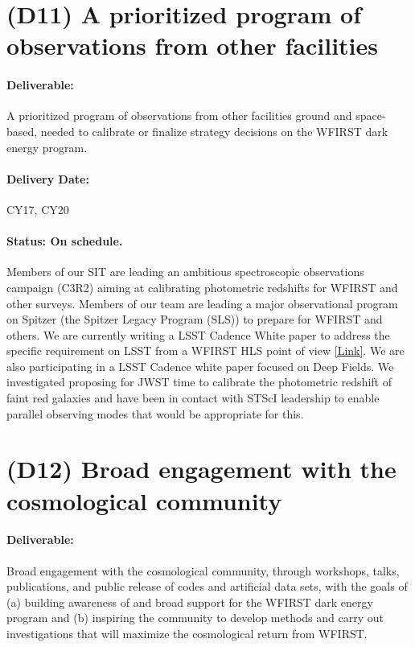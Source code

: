 \section*{(D11) A prioritized program of observations from other facilities}

\paragraph*{Deliverable:} A prioritized program of observations from other facilities
ground and space-based, needed to calibrate or finalize strategy decisions on
the WFIRST dark energy program.

\paragraph*{Delivery Date:} CY17, CY20

\paragraph*{Status: On schedule.} Members of our SIT are leading an ambitious spectroscopic observations campaign (C3R2) aiming at calibrating photometric redshifts
for WFIRST and other surveys. Members of our team are leading a major
observational program on Spitzer (the Spitzer Legacy Program (SLS)) to prepare for WFIRST and others. We are currently writing a LSST Cadence White paper to address the specific requirement on LSST from a WFIRST HLS point of view  \href{https://www.lsst.org/call-whitepaper-2018}{[Link]}. We are also participating in a LSST Cadence white paper focused on Deep Fields. We investigated proposing for JWST time to calibrate the photometric redshift of faint red galaxies \cite{Hemmati:2018} and have been in contact with STScI leadership to enable parallel observing modes that would be appropriate for this.



\section*{(D12) Broad engagement with the cosmological community}

\paragraph*{Deliverable:} Broad engagement with the cosmological community, through
workshops, talks, publications, and public release of codes and artificial data
sets, with the goals of (a) building awareness of and broad support for the
WFIRST dark energy program and (b) inspiring the community to develop methods
and carry out investigations that will maximize the cosmological return from
WFIRST.

